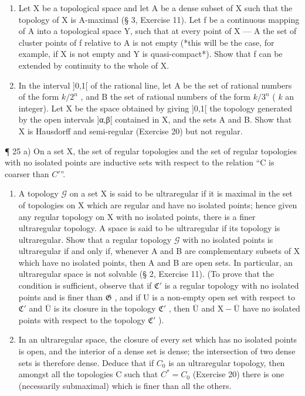 \begin{enumerate}
\def\labelenumi{\arabic{enumi})}
\setcounter{enumi}{22}
\item
  Let X be a topological space and let A be a dense subset of X such that the topology of X is A-maximal (§ 3, Exercise 11). Let f be a continuous mapping of A into a topological space Y, such that at every point of X --- A the set of cluster points of f relative to A is not empty (*this will be the case, for example, if X is not empty and Y is quasi-compact*). Show that f can be extended by continuity to the whole of X.
\item
  In the interval {]}0,1{[} of the rational line, let A be the set of rational numbers of the form \(k/2^n\) , and B the set of rational numbers of the form \(k/3^n\) ( \(k\) an integer). Let X be the space obtained by giving {]}0,1{[} the topology generated by the open intervals {]}α,β{[} contained in X, and the sets A and B. Show that X is Hausdorff and semi-regular (Exercise 20) but not regular.
\end{enumerate}

¶ 25 a) On a set X, the set of regular topologies and the set of regular topologies with no isolated points are inductive sets with respect to the relation ``C is coarser than \(C'\)''.

\begin{enumerate}
\def\labelenumi{\alph{enumi})}
\setcounter{enumi}{1}
\item
  A topology \(\mathcal{G}\) on a set X is said to be ultraregular if it is maximal in the set of topologies on X which are regular and have no isolated points; hence given any regular topology on X with no isolated points, there is a finer ultraregular topology. A space is said to be ultraregular if its topology is ultraregular. Show that a regular topology \(\mathcal{G}\) with no isolated points is ultraregular if and only if, whenever A and B are complementary subsets of X which have no isolated points, then A and B are open sets. In particular, an ultraregular space is not solvable (§ 2, Exercise 11). (To prove that the condition is sufficient, observe that if \(\mathfrak{C}'\) is a regular topology with no isolated points and is finer than \(\mathfrak{G}\) , and if U is a non-empty open set with respect to \(\mathfrak{C}'\) and \(\overline{\mathrm{U}}\) is its closure in the topology \(\mathfrak{C}'\) , then \(\overline{\mathrm{U}}\) and \(\mathrm{X} - \overline{\mathrm{U}}\) have no isolated points with respect to the topology \(\mathfrak{C}'\) ).
\item
  In an ultraregular space, the closure of every set which has no isolated points is open, and the interior of a dense set is dense; the intersection of two dense sets is therefore dense. Deduce that if \(C_{0}\) is an ultraregular topology, then amongst all the topologies C such that \(C^{*} = C_{0}\) (Exercise 20) there is one (necessarily submaximal) which is finer than all the others.
\end{enumerate}

